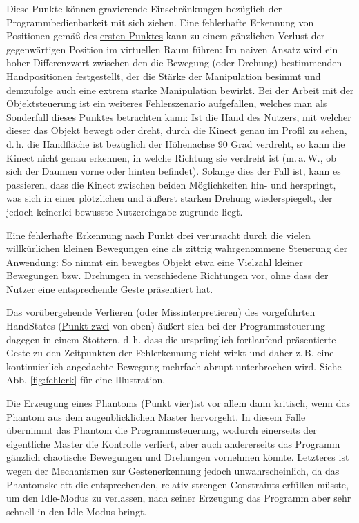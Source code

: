 	Diese Punkte können gravierende Einschränkungen bezüglich der Programmbedienbarkeit mit sich ziehen. Eine fehlerhafte Erkennung von Positionen gemäß des \hyperref[itm:problem1]{ersten Punktes} kann zu einem gänzlichen Verlust der gegenwärtigen Position im virtuellen Raum führen: Im naiven Ansatz wird ein hoher Differenzwert zwischen den die Bewegung (oder Drehung) bestimmenden Handpositionen festgestellt, der die Stärke der Manipulation besimmt und demzufolge auch eine extrem starke Manipulation bewirkt. Bei der Arbeit mit der Objektsteuerung ist ein weiteres Fehlerszenario aufgefallen, welches man als Sonderfall dieses Punktes betrachten kann: Ist die Hand des Nutzers, mit welcher dieser das Objekt bewegt oder dreht, durch die Kinect genau im Profil zu sehen, d.\,h. die Handfläche ist bezüglich der Höhenachse 90 Grad verdreht, so kann die Kinect nicht genau erkennen, in welche Richtung sie verdreht ist (m.\,a.\,W., ob sich der Daumen vorne oder hinten befindet). Solange dies der Fall ist, kann es passieren, dass die Kinect zwischen beiden Möglichkeiten hin- und herspringt, was sich in einer plötzlichen und äußerst starken Drehung wiederspiegelt, der jedoch keinerlei bewusste Nutzereingabe zugrunde liegt.\par 
	Eine fehlerhafte Erkennung nach \hyperref[itm:problem3]{Punkt drei} verursacht durch die vielen willkürlichen kleinen Bewegungen eine als \glqq zittrig\grqq{} wahrgenommene Steuerung der Anwendung: So nimmt ein bewegtes Objekt etwa eine Vielzahl kleiner Bewegungen bzw. Drehungen in verschiedene Richtungen vor, ohne dass der Nutzer eine entsprechende Geste präsentiert hat.\par 
	Das vorübergehende Verlieren (oder Missinterpretieren) des vorgeführten HandStates (\hyperref[itm:problem2]{Punkt zwei} von oben) äußert sich bei der Programmsteuerung dagegen in einem Stottern, d.\,h. dass die ursprünglich fortlaufend präsentierte Geste zu den Zeitpunkten der Fehlerkennung nicht wirkt und daher z.\,B. eine kontinuierlich angedachte Bewegung mehrfach abrupt unterbrochen wird. Siehe Abb. \ref{fig:fehlerk} für eine Illustration.\par 
	Die Erzeugung eines Phantoms (\hyperref[itm:problem4]{Punkt vier})ist vor allem dann kritisch, wenn das Phantom aus dem augenblicklichen Master hervorgeht. In diesem Falle übernimmt das Phantom die Programmsteuerung, wodurch einerseits der eigentliche Master die Kontrolle verliert, aber auch andererseits das Programm gänzlich chaotische Bewegungen und Drehungen vornehmen könnte. Letzteres ist wegen der Mechanismen zur Gestenerkennung jedoch unwahrscheinlich, da das Phantomskelett die entsprechenden, relativ strengen Constraints  erfüllen müsste, um den Idle-Modus zu verlassen, nach seiner Erzeugung das Programm aber  sehr schnell in den Idle-Modus bringt.\par 
